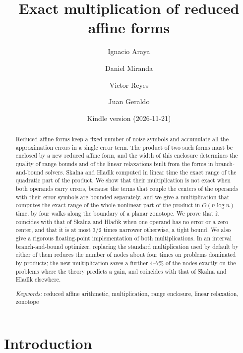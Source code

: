 \documentclass[10pt]{article}
\title{Exact multiplication of reduced affine forms}
\author{Ignacio Araya \and Daniel Miranda \and Victor Reyes \and Juan Geraldo}
\date{\small Kindle version \DIFdelbegin \DIFdel{v6 }\DIFdelend \DIFaddbegin \DIFadd{v7 }\DIFaddend (2026-11-21)}
\theoremstyle{definition}
\begin{document}
\maketitle

\begin{abstract}
Reduced affine forms keep a fixed number of noise symbols and accumulate all the approximation errors in a single error term. The product of two such forms must be enclosed by a new reduced affine form, and the width of this enclosure determines the quality of range bounds and of the linear relaxations built from the forms in branch-and-bound solvers. Skalna and Hlad\'{\i}k computed in linear time the exact range of the quadratic part of the product. We show that their multiplication is not exact when both operands carry errors, because the terms that couple the centers of the operands with their error symbols are bounded separately, and we give a multiplication that computes the exact range of the whole nonlinear part of the product in $O(n\log n)$ time, by four walks along the boundary of a planar zonotope. We prove that it coincides with that of Skalna and Hlad\'{\i}k when one operand has no error or a zero center, and that it is at most $3/2$ times narrower otherwise, a tight bound. We also give a rigorous floating-point implementation of both multiplications. In an interval branch-and-bound optimizer, replacing the standard multiplication used by default by either of them reduces the number of nodes about four times on problems dominated by products; the new multiplication saves a further 4--7\% of the nodes exactly on the problems where the theory predicts a gain, and coincides with that of Skalna and Hlad\'{\i}k elsewhere.

\medskip\noindent
\textit{Keywords:} reduced affine arithmetic, multiplication, range enclosure, linear relaxation, zonotope
\end{abstract}

\section{Introduction}
\end{document}
